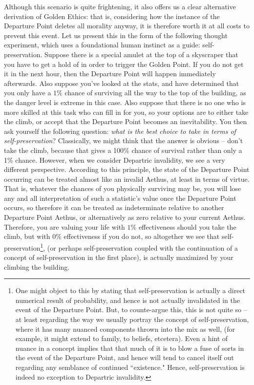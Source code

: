 Although this scenario is quite frightening, it also offers us a clear alternative derivation of Golden Ethics: that is, considering how the instance of the Departure Point deletes all morality anyway, it is therefore worth it at all costs to prevent this event. Let us present this in the form of the following thought experiment, which uses a foundational human instinct as a guide: self-preservation. Suppose there is a special amulet at the top of a skyscraper that you have to get a hold of in order to trigger the Golden Point. If you do not get it in the next hour, then the Departure Point will happen immediately afterwards. Also suppose you've looked at the stats, and have determined that you only have a $1\%$ chance of surviving all the way to the top of the building, as the danger level is extreme in this case. Also suppose that there is no one who is more skilled at this task who can fill in for you, so your options are to either take the climb, or accept that the Departure Point becomes an inevitability. You then ask yourself the following question: \textit{what is the best choice to take in terms of self-preservation}? Classically, we might think that the answer is obvious -- don't take the climb, because that gives a 100\% chance of survival rather than only a 1\% chance. However, when we consider Departric invalidity, we see a very different perspective. According to this principle, the state of the Departure Point occurring can be treated almost like an invalid Aethus, at least in terms of virtue. That is, whatever the chances of you physically surviving may be, you will lose any and all interpretation of such a statistic's value once the Departure Point occurs, so therefore it can be treated as indeterminate relative to another Departure Point Aethus, or alternatively as zero relative to your current Aethus. Therefore, you are valuing your life with $1\%$ effectiveness should you take the climb, but with $0\%$ effectiveness if you do not, so altogether we see that self-preservation\footnote{One might object to this by stating that self-preservation is actually a direct numerical result of probability, and hence is not actually invalidated in the event of the Departure Point. But, to counte-argue this, this is not quite so -- at least regarding the way we usually portray the concept of self-preservation, where it has many nuanced components thrown into the mix as well, (for example, it might extend to family, to beliefs, etcetera). Even a hint of nuance in a concept implies that that much of it is to blow a fuse of sorts in the event of the Departure Point, and hence will tend to cancel itself out regarding any semblance of continued ``existence." Hence, self-preservation is indeed no exception to Departric invalidity.}, (or perhaps self-preservation coupled with the continuation of a concept of self-preservation in the first place), is actually maximized by your climbing the building. 

